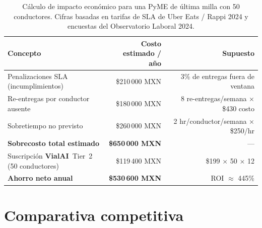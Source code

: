 \documentclass[11pt,a4paper]{article}
\newcommand{\VialAI}{\textbf{\textcolor{vialTeal}{Vial}\textcolor{vialAmber}{AI}}}
\begin{document}
\begin{table}[H]
\centering
\small
\renewcommand{\arraystretch}{1.5}
\begin{tabular}{@{}lrr@{}}
\toprule
\rowcolor{vialNavy!10}
\textbf{Concepto} & \textbf{Costo estimado / año} & \textbf{Supuesto} \\
\midrule
Penalizaciones SLA (incumplimientos) & \$210\,000 MXN & 3\% de entregas fuera de ventana \\
Re-entregas por conductor ausente & \$180\,000 MXN & 8 re-entregas/semana × \$430 costo \\
Sobretiempo no previsto & \$260\,000 MXN & 2 hr/conductor/semana × \$250/hr \\
\midrule
\textbf{Sobrecosto total estimado} & \textbf{\$650\,000 MXN} & --- \\
\midrule\midrule
Suscripción \VialAI\ Tier~2 (50 conductores) & \$119\,400 MXN & \$199 × 50 × 12 \\
\textbf{Ahorro neto anual} & \textbf{\$530\,600 MXN} & ROI $\approx$ 445\% \\
\bottomrule
\end{tabular}
\caption{Cálculo de impacto económico para una PyME de última milla con 50 conductores.
         Cifras basadas en tarifas de SLA de Uber Eats / Rappi 2024 y encuestas
         del Observatorio Laboral 2024.}
\label{tab:roi}
\end{table}

\section{Comparativa competitiva}
\end{document}
